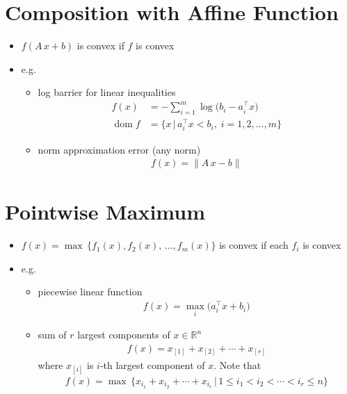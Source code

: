 \documentclass[11pt]{extarticle}
\newcommand{\ds}{\displaystyle}
\DeclareMathOperator*{\dom}{dom}
\theoremstyle{definition}
\begin{document}
\newpage

\section*{Composition with Affine Function}

\begin{itemize}
  \item $\ds f(A\,x + b)$ is convex if $f$ is convex
  \item e.g.
    \begin{itemize}
      \item log barrier for linear inequalities
        \begin{align*}
          f(x) &= - \sum_{i = 1}^m \log\big(b_i - a_i^\top x\big) \\
          \dom f &= \{x\,|\,a_i^\top x < b_i,\;i=1,2,\ldots,m\}
        \end{align*}
      \item norm approximation error (any norm)
        \begin{align*}
          f(x) = \|A\,x - b\|
        \end{align*}
    \end{itemize}
\end{itemize}

\newpage

\section*{Pointwise Maximum}

\begin{itemize}
  \item $\ds f(x) = \max\,\{f_1(x),f_2(x),\,\ldots,f_m(x)\}$ is convex if each $f_i$ is convex
  \item e.g.
    \begin{itemize}
      \item piecewise linear function
        \begin{align*}
          f(x) = \max_i\big(a_i^\top x + b_i\big)
        \end{align*}
      \item sum of $r$ largest components of $x\in\mathbb{R}^n$  
        \begin{align*}
          f(x) = x_{[1]} + x_{[2]} + \cdots + x_{[r]}
        \end{align*}
        where $x_{[i]}$ is $i$-th largest component of $x$. Note that
        \begin{align*}
          f(x) = \max\,\{x_{i_1} + x_{i_2} + \cdots + x_{i_r}\,|\,1\leqslant i_1 < i_2 < \cdots < i_r\leqslant n\}
        \end{align*}
    \end{itemize}
\end{itemize}
\end{document}
